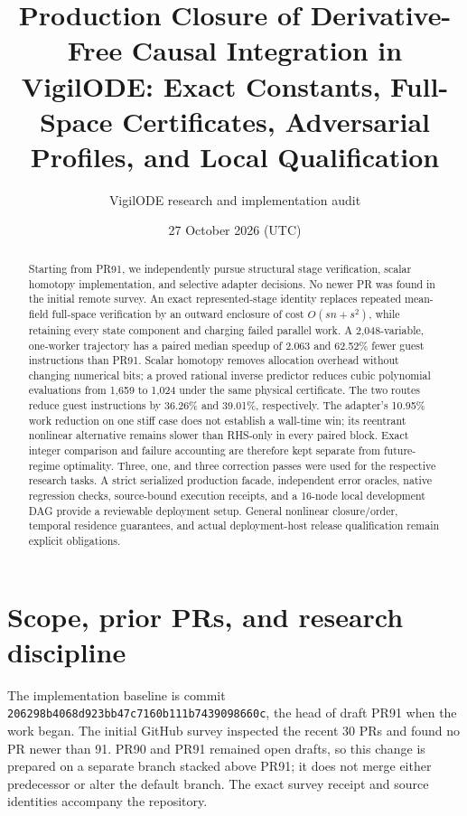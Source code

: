 \documentclass[aps,pra,reprint,onecolumn,12pt,notitlepage,superscriptaddress,nofootinbib]{revtex4-2}
\begin{document}
\title{Production Closure of Derivative-Free Causal Integration in VigilODE:
Exact Constants, Full-Space Certificates, Adversarial Profiles, and Local Qualification}
\author{VigilODE research and implementation audit}
\noaffiliation
\date{27 October 2026 (UTC)}
\begin{abstract}
Starting from PR91, we independently pursue structural stage verification,
scalar homotopy implementation, and selective adapter decisions. No newer PR
was found in the initial remote survey. An exact represented-stage identity
replaces repeated mean-field full-space verification by an outward enclosure
of cost $O(sn+s^2)$, while retaining every state component and charging failed
parallel work. A 2,048-variable, one-worker trajectory has a paired median
speedup of 2.063 and 62.52\% fewer guest instructions than PR91. Scalar
homotopy removes allocation overhead without changing numerical bits; a
proved rational inverse predictor reduces cubic polynomial evaluations from
1,659 to 1,024 under the same physical certificate. The two routes reduce
guest instructions by 36.26\% and 39.01\%, respectively. The adapter's
10.95\% work reduction on one stiff case does not establish a wall-time win;
its reentrant nonlinear alternative remains slower than RHS-only in every
paired block. Exact integer comparison and failure accounting are therefore
kept separate from future-regime optimality. Three, one, and three correction
passes were used for the respective research tasks. A strict serialized
production facade, independent error oracles, native regression checks,
source-bound execution receipts, and a 16-node local development DAG provide
a reviewable deployment setup. General nonlinear closure/order, temporal
residence guarantees, and actual deployment-host release qualification
remain explicit obligations.
\end{abstract}
\maketitle

\section{Scope, prior PRs, and research discipline}
The implementation baseline is commit
\texttt{206298b4068d923bb47c7160b111b7439098660c}, the head of draft PR91
when the work began. The initial GitHub survey inspected the recent 30 PRs
and found no PR newer than 91. PR90 and PR91 remained open drafts, so this
change is prepared on a separate branch stacked above PR91; it does not
merge either predecessor or alter the default branch. The exact survey
receipt and source identities accompany the repository.
\end{document}
